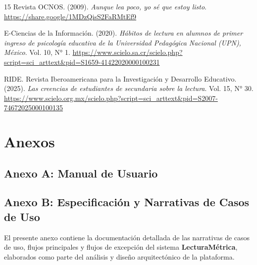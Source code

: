\documentclass[12pt, atypical, journal]{article}
\begin{document}
\begin{thebibliography}{15}
Revista OCNOS. (2009). \textit{Aunque lea poco, yo sé que estoy listo}. \url{https://share.google/1MDzQisS2FaRMtEf9}

E-Ciencias de la Información. (2020). \textit{Hábitos de lectura en alumnos de primer ingreso de psicología educativa de la Universidad Pedagógica Nacional (UPN), México}. Vol. 10, N° 1. \url{https://www.scielo.sa.cr/scielo.php?script=sci_arttext&pid=S1659-41422020000100231}

RIDE. Revista Iberoamericana para la Investigación y Desarrollo Educativo. (2025). \textit{Las creencias de estudiantes de secundaria sobre la lectura}. Vol. 15, N° 30. \url{https://www.scielo.org.mx/scielo.php?script=sci_arttext&pid=S2007-74672025000100135}

\end{thebibliography}

\newpage
\section*{Anexos}

\subsection*{Anexo A: Manual de Usuario}


\subsection*{Anexo B: Especificación y Narrativas de Casos de Uso}
El presente anexo contiene la documentación detallada de las narrativas de casos de uso, flujos principales y flujos de excepción del sistema \textbf{LecturaMétrica}, elaborados como parte del análisis y diseño arquitectónico de la plataforma.

\vspace{0.5cm}


\end{document}
